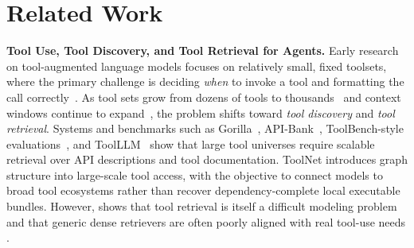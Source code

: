 \section{Related Work}

\noindent\textbf{Tool Use, Tool Discovery, and Tool Retrieval for Agents.}
%
Early research on tool-augmented language models focuses on relatively small, fixed toolsets, where the primary challenge is deciding \emph{when} to invoke a tool and formatting the call correctly~\citep{schick2023toolformer, mialon2023augmented}.
%
As tool sets grow from dozens of tools to thousands~\citep{patil2023gorilla, li2023apibank, xu2023toolbench, qin2024toolllm} and context windows continue to expand~\citep{singh2025openai,li2026mm, comanici2025gemini}, the problem shifts toward \emph{tool discovery} and \emph{tool retrieval}. Systems and benchmarks such as Gorilla~\cite{patil2023gorilla}, API-Bank~\cite{li2023apibank}, ToolBench-style evaluations~\cite{xu2023toolbench}, and ToolLLM~\cite{qin2024toolllm} show that large tool universes require scalable retrieval over API descriptions and tool documentation.
%
ToolNet \citep{liu2024toolnet} introduces graph structure into large-scale tool access, with the objective to connect models to broad tool ecosystems rather than recover dependency-complete local executable bundles. 
%
However, \citet{shi2025toolret} shows that tool retrieval is itself a difficult modeling problem and that generic dense retrievers are often poorly aligned with real tool-use needs \citep{shi2025toolret}. 
%


